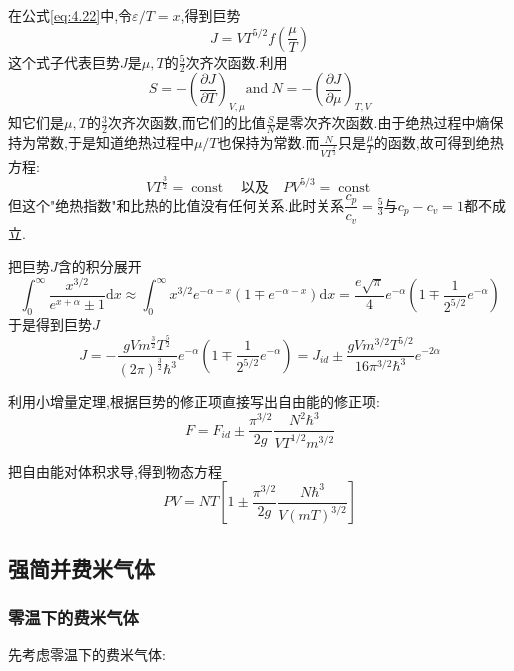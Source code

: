     在公式\eqref{eq:4.22}中,令$\varepsilon / T = x$,得到巨势
    \begin{equation}
      J=V T^{5 /2 }f(\dfrac{\mu}{T})
    \end{equation}
    这个式子代表巨势$J$是$\mu,T$的$\frac{5}{2}$次齐次函数.利用 
    \[S=-\left( \dfrac{\partial J}{\partial T} \right) _{V,\mu}\text{and}~N=-\left( \dfrac{\partial J}{\partial \mu} \right) _{T,V}\]
    知它们是$\mu,T$的$\frac{3}{2}$次齐次函数,而它们的比值$\frac{S}{N}$是零次齐次函数.由于绝热过程中熵保持为常数,于是知道绝热过程中$\mu / T$也保持为常数.而$\frac{N}{VT^{\frac{3}{2}}}$只是$\frac{\mu}{T}$的函数,故可得到绝热方程:
    \begin{equation}
      VT^{\frac{3}{2}}=\operatorname{const}\quad\text{以及}\quad PV^{5 / 3}=\operatorname{const}
    \end{equation}
    但这个"绝热指数"和比热的比值没有任何关系.此时关系$\dfrac{c_p}{c_v}=\frac{5}{3}$与$c_p-c_v=1$都不成立.

    \vspace*{0.3cm}

    把巨势$J$含的积分展开
    \[\int_{0}^{\infty} \dfrac{x^{3 / 2}}{e^{x+\alpha}\pm 1} \mathrm{d}x\approx  \int_{0}^{\infty} x^{3 /2 }e^{-\alpha-x}(1\mp  e^{-\alpha-x}) \mathrm{d}x=\dfrac{e\sqrt{\pi}}{4}e^{-\alpha}\left( 1\mp \dfrac{1}{2^{5 / 2 }}e^{-\alpha} \right) \]   
    于是得到巨势$J$
    \begin{equation}
      J=-\dfrac{g V m^{\frac{3}{2}} T^{\frac{5}{2}}}{(2\pi)^{\frac{3}{2}}\hbar^{3}} e^{-\alpha}\left( 1\mp \dfrac{1}{2^{5 /2}}e^{-\alpha} \right) =J_{id}\pm \dfrac{g V m^{3 /2 }T^{ 5/2} }{16\pi^{3 / 2}\hbar^{3}}e^{-2\alpha}
    \end{equation}

    利用小增量定理,根据巨势的修正项直接写出自由能的修正项:
    \begin{equation}
      F=F_{id}\pm \dfrac{\pi ^{ 3 / 2}}{2g}\dfrac{N^{2}\hbar^{3}}{VT^{1 / 2} m ^{3/2}}
    \end{equation}

    把自由能对体积求导,得到物态方程
    \begin{equation}
      PV=NT\left[ 1\pm \dfrac{\pi^{3 / 2}}{2g}\dfrac{N\hbar^{3}}{V(mT)^{3 / 2}} \right] 
    \end{equation}

\subsection{强简并费米气体}
\subsubsection{零温下的费米气体}
    先考虑零温下的费米气体:

